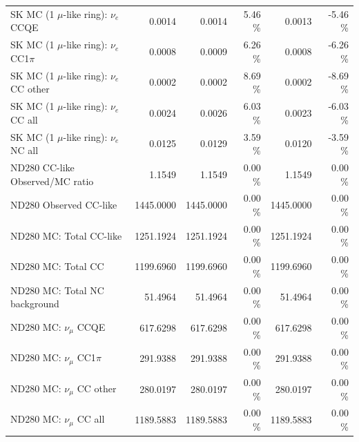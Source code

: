 \begin{table}
\begin{tabular}{| l | r | r  r | r  r |}
                             SK MC (1 $\mu$-like ring): $\nu_{e}$ CCQE &          0.0014 &          0.0014 &  5.46 \%  &          0.0013 & -5.46 \%  \\ 
                         SK MC (1 $\mu$-like ring): $\nu_{e}$ CC1$\pi$ &          0.0008 &          0.0009 &  6.26 \%  &          0.0008 & -6.26 \%  \\ 
                         SK MC (1 $\mu$-like ring): $\nu_{e}$ CC other &          0.0002 &          0.0002 &  8.69 \%  &          0.0002 & -8.69 \%  \\ 
                           SK MC (1 $\mu$-like ring): $\nu_{e}$ CC all &          0.0024 &          0.0026 &  6.03 \%  &          0.0023 & -6.03 \%  \\ 
                           SK MC (1 $\mu$-like ring): $\nu_{e}$ NC all &          0.0125 &          0.0129 &  3.59 \%  &          0.0120 & -3.59 \%  \\ 
\hline
                                       ND280 CC-like Observed/MC ratio &          1.1549 &          1.1549 &  0.00 \%  &          1.1549 &  0.00 \%  \\ 
                                                ND280 Observed CC-like &       1445.0000 &       1445.0000 &  0.00 \%  &       1445.0000 &  0.00 \%  \\ 
                                               ND280 MC: Total CC-like &       1251.1924 &       1251.1924 &  0.00 \%  &       1251.1924 &  0.00 \%  \\ 
                                                    ND280 MC: Total CC &       1199.6960 &       1199.6960 &  0.00 \%  &       1199.6960 &  0.00 \%  \\ 
                                         ND280 MC: Total NC background &         51.4964 &         51.4964 &  0.00 \%  &         51.4964 &  0.00 \%  \\ 
\hline
                                            ND280 MC: $\nu_{\mu}$ CCQE &        617.6298 &        617.6298 &  0.00 \%  &        617.6298 &  0.00 \%  \\ 
                                        ND280 MC: $\nu_{\mu}$ CC1$\pi$ &        291.9388 &        291.9388 &  0.00 \%  &        291.9388 &  0.00 \%  \\ 
                                        ND280 MC: $\nu_{\mu}$ CC other &        280.0197 &        280.0197 &  0.00 \%  &        280.0197 &  0.00 \%  \\ 
                                          ND280 MC: $\nu_{\mu}$ CC all &       1189.5883 &       1189.5883 &  0.00 \%  &       1189.5883 &  0.00 \%  \\ 

\end{tabular}
\end{table}
